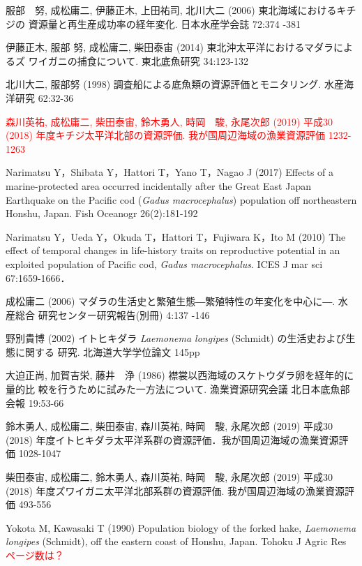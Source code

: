 \documentclass[11pt]{article} %
\begin{document}
\begin{linenumbers}
\hangindent=30pt
\noindent
服部　努, 成松庸二, 伊藤正木, 上田祐司, 北川大二 (2006) 東北海域におけるキチジの
資源量と再生産成功率の経年変化. 日本水産学会誌 72:374 -381

\hangindent=30pt
\noindent
伊藤正木, 服部 努, 成松庸二, 柴田泰宙 (2014) 東北沖太平洋におけるマダラによるズ
ワイガニの捕食について. 東北底魚研究 34:123-132

\hangindent=30pt
\noindent
北川大二, 服部努 (1998) 調査船による底魚類の資源評価とモニタリング. 水産海洋研究 62:32-36

\hangindent=30pt
\noindent
\textcolor{red}{森川英祐, 成松庸二, 柴田泰宙, 鈴木勇人, 時岡　駿, 永尾次郎 (2019) 平成30 (2018) 年度キチジ太平洋北部の資源評価. 我が国周辺海域の漁業資源評価 1232-1263}

\hangindent=30pt
\noindent
Narimatsu Y，Shibata Y，Hattori T，Yano T，Nagao J (2017) Effects of a marine-protected area occurred incidentally after the Great East Japan Earthquake on the Pacific cod (\textit{Gadus macrocephalus}) population off northeastern Honshu, Japan. Fish Oceanogr 26(2):181-192

\hangindent=30pt
\noindent
Narimatsu Y，Ueda Y，Okuda T，Hattori T，Fujiwara K，Ito M (2010) The effect of temporal changes in life-history traits on reproductive potential in an exploited population of Pacific cod, \textit{Gadus macrocephalus}. ICES J mar sci 67:1659-1666．

\hangindent=30pt
\noindent
成松庸二 (2006) マダラの生活史と繁殖生態―繁殖特性の年変化を中心に―. 水産総合
研究センター研究報告(別冊) 4:137 -146

\hangindent=30pt
\noindent
野別貴博 (2002) イトヒキダラ \textit{Laemonema longipes} (Schmidt) の生活史および生態に関する
研究. 北海道大学学位論文 145pp

\hangindent=30pt
\noindent
大迫正尚, 加賀吉栄, 藤井　浄 (1986) 襟裳以西海域のスケトウダラ卵を経年的に量的比
較を行うために試みた一方法について. 漁業資源研究会議 北日本底魚部会報 19:53-66

\hangindent=30pt
\noindent
鈴木勇人, 成松庸二, 柴田泰宙, 森川英祐, 時岡　駿, 永尾次郎 (2019) 平成30 (2018) 年度イトヒキダラ太平洋系群の資源評価．我が国周辺海域の漁業資源評価 1028-1047

\hangindent=30pt
\noindent
柴田泰宙, 成松庸二, 鈴木勇人, 森川英祐, 時岡　駿, 永尾次郎 (2019) 平成30 (2018) 
年度ズワイガニ太平洋北部系群の資源評価. 我が国周辺海域の漁業資源評価 493-556

\hangindent=30pt
\noindent
Yokota M, Kawasaki T (1990) Population biology of the forked hake, \textit{Laemonema longipes} 
 (Schmidt), off the eastern coast of Honshu, Japan. Tohoku J Agric Res 
\textcolor{red}{ページ数は？}


\end{linenumbers}
\end{document}
